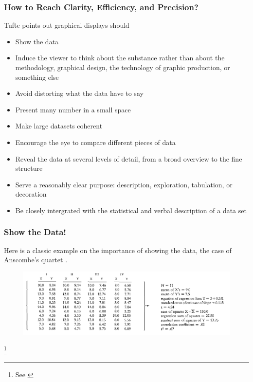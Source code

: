 \documentclass[notes, aspectratio=1610]{beamer}
\begin{document}
\begin{frame}
	\frametitle{How to Reach Clarity, Efficiency, and Precision?}
	Tufte points out graphical displays should
	\begin{itemize}
		\item 
		Show the data
		\item 
		Induce the viewer to think about the substance rather than
		about the methodology, graphical design, the technology of 
		graphic production, or something else 
		\item 
		Avoid distorting what the data have to say 
		\item
		Present many number in a small space 
		\item 
		Make large datasets coherent
		\item
		Encourage the eye to compare different pieces of data 
		\item 
		Reveal the data at several levels of detail, from a broad 
		overview to the fine structure 
		\item 
		Serve a reasonably clear purpose: description, 
		exploration, tabulation, or decoration 
		\item 
		Be closely intergrated with the statistical and verbal 
		description of a data set 
	\end{itemize}
\end{frame}

\begin{frame}
	\frametitle{Show the Data!}
	Here is a classic example on the importance of showing the data, 
	the case of Anscombe's quartet \cite{anscombe1973}.

	\begin{figure}
		\begin{small}
			\begin{center}
				\includegraphics[width=1\textwidth]{
					images/anscombe_i.png
					}
			\end{center}
		\end{small}
	\end{figure}
	\footnote{See \cite[][page 14]{tufte2001}}
\end{frame}
\end{document}
